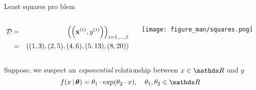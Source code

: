 \documentclass[11pt,compress,t,notes=noshow, xcolor=table]{beamer}
\begin{document}
\begin{vbframe}{Least squares pro blem}
\begin{columns}
\begin{column}{0.55\textwidth}
\begin{footnotesize}
\begin{eqnarray*}
\mathcal{D} &=& \left(\left(\mathbf{x}^{(i)}, y^{(i)}\right)\right)_{i = 1, ..., 5} \\ &=& \left((1,3),(2,5),(4,6),(5,13),(8,20)\right)
\end{eqnarray*}
\end{footnotesize}
\end{column}
\begin{column}{0.4\textwidth}
	\vspace*{-0.5cm}  
    \begin{center}
     \texttt{[image: figure\_man/squares.png]}
     \end{center}
\end{column}
\end{columns}







\framebreak

Suppose, we suspect an \textit{exponential} relationship between $x \in \R$ and $y$ 
\begin{equation*}
    f(x \,|\, \thetav) = \theta_1 \cdot \exp(\theta_2 \cdot x), \quad \theta_1, \theta_2 \in \R
\end{equation*}




\end{vbframe}
\end{document}
